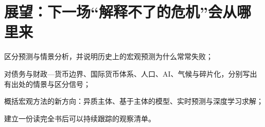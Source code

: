 \chapter{展望：下一场“解释不了的危机”会从哪里来}\label{ch:outlook}

\begin{chapterguide}
\begin{guidegoals}
\item 区分预测与情景分析，并说明历史上的宏观预测为什么常常失败；
\item 对债务与财政—货币边界、国际货币体系、人口、AI、气候与碎片化，分别写出有出处的情景与区分信号；
\item 概括宏观方法的新方向：异质主体、基于主体的模型、实时预测与深度学习求解；
\item 建立一份读完全书后可以持续跟踪的观察清单。
\end{guidegoals}
\end{chapterguide}

\chapterstub
